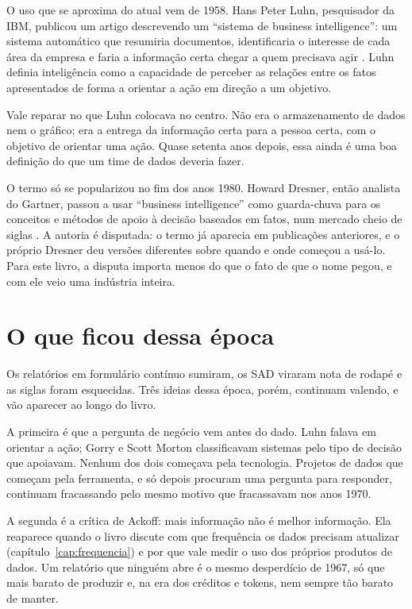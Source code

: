 O uso que se aproxima do atual vem de 1958. Hans Peter Luhn, pesquisador da IBM,
publicou um artigo descrevendo um \enquote{sistema de business intelligence}: um sistema
automático que resumiria documentos, identificaria o interesse de cada área da empresa e
faria a informação certa chegar a quem precisava agir \parencite{luhn1958}. Luhn definia
inteligência como a capacidade de perceber as relações entre os fatos apresentados de
forma a orientar a ação em direção a um objetivo. 

Vale reparar no que Luhn colocava no centro. Não era o armazenamento de dados nem o
gráfico; era a entrega da informação certa para a pessoa certa, com o objetivo de
orientar uma ação. Quase setenta anos depois, essa ainda é uma boa definição do que um
time de dados deveria fazer.

O termo só se popularizou no fim dos anos 1980. Howard Dresner, então analista do
Gartner, passou a usar \enquote{business intelligence} como guarda-chuva para os
conceitos e métodos de apoio à decisão baseados em fatos, num mercado cheio de siglas
\parencite{computerworld2006}. A autoria é disputada: o termo já aparecia em
publicações anteriores, e o próprio Dresner deu versões diferentes sobre quando e onde
começou a usá-lo. Para este livro, a disputa importa menos do que o fato de que o nome
pegou, e com ele veio uma indústria inteira.

\section{O que ficou dessa época}
\label{sec:legado-origens}

Os relatórios em formulário contínuo sumiram, os SAD viraram nota de rodapé e as siglas
foram esquecidas. Três ideias dessa época, porém, continuam valendo, e vão aparecer ao
longo do livro.

A primeira é que a pergunta de negócio vem antes do dado. Luhn falava em orientar a
ação; Gorry e Scott Morton classificavam sistemas pelo tipo de decisão que apoiavam.
Nenhum dos dois começava pela tecnologia. Projetos de dados que começam pela ferramenta,
e só depois procuram uma pergunta para responder, continuam fracassando pelo mesmo
motivo que fracassavam nos anos 1970.

A segunda é a crítica de Ackoff: mais informação não é melhor informação. Ela reaparece
quando o livro discute com que frequência os dados precisam atualizar
(capítulo~\ref{cap:frequencia}) e por que vale medir o uso dos próprios produtos de dados.
Um relatório que ninguém abre é o mesmo desperdício de 1967, só que mais barato de
produzir e, na era dos créditos e tokens, nem sempre tão barato de manter.


